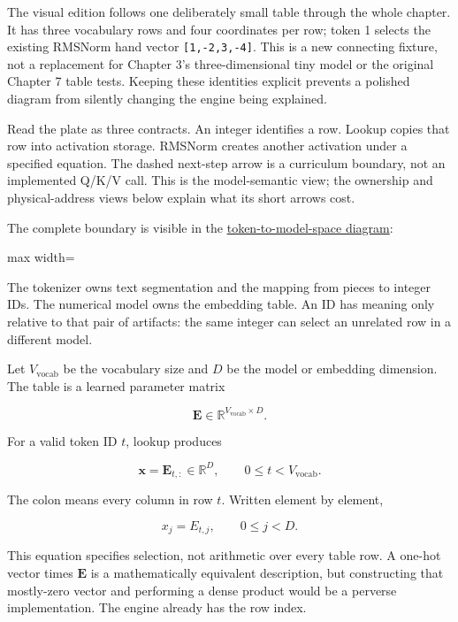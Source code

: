 \documentclass[
  10pt,
]{article}
\begin{document}
The visual edition follows one deliberately small table through the
whole chapter. It has three vocabulary rows and four coordinates per
row; token 1 selects the existing RMSNorm hand vector
\texttt{{[}1,-2,3,-4{]}}. This is a new connecting fixture, not a
replacement for Chapter 3's three-dimensional tiny model or the original
Chapter 7 table tests. Keeping these identities explicit prevents a
polished diagram from silently changing the engine being explained.

Read the plate as three contracts. An integer identifies a row. Lookup
copies that row into activation storage. RMSNorm creates another
activation under a specified equation. The dashed next-step arrow is a
curriculum boundary, not an implemented Q/K/V call. This is the
model-semantic view; the ownership and physical-address views below
explain what its short arrows cost.

The complete boundary is visible in the
\href{https://github.com/hermonai/inside-the-llm-engine/blob/astra-visual-rewrite/diagrams/transformer/token-to-model-space.txt}{token-to-model-space
diagram}:

\begin{center}\begin{adjustbox}{max width=\linewidth}\end{adjustbox}\end{center}

The tokenizer owns text segmentation and the mapping from pieces to
integer IDs. The numerical model owns the embedding table. An ID has
meaning only relative to that pair of artifacts: the same integer can
select an unrelated row in a different model.

Let \(V_{\mathrm{vocab}}\) be the vocabulary size and \(D\) be the model
or embedding dimension. The table is a learned parameter matrix

\[
\mathbf{E}\in\mathbb{R}^{V_{\mathrm{vocab}}\times D}.
\]

For a valid token ID \(t\), lookup produces

\[
\mathbf{x}=\mathbf{E}_{t,:}\in\mathbb{R}^{D},
\qquad 0\le t<V_{\mathrm{vocab}}.
\]

The colon means every column in row \(t\). Written element by element,

\[
x_j=E_{t,j},
\qquad 0\le j<D.
\]

This equation specifies selection, not arithmetic over every table row.
A one-hot vector times \(\mathbf{E}\) is a mathematically equivalent
description, but constructing that mostly-zero vector and performing a
dense product would be a perverse implementation. The engine already has
the row index.
\end{document}

